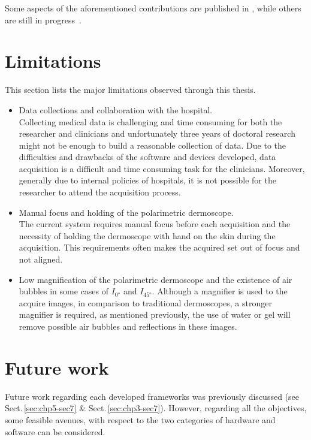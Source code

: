 Some aspects of the aforementioned contributions are published in \cite{rastgoo2015automatic,rastgoo2015ensemble,rastgoo2016classification,rastgoo2016tackling}, while others are still in progress~\cite{rastgoopol2,rastgoocadpol}.

\section{Limitations}\label{sec:chp6-sec3}
This section lists the major limitations observed through this thesis.
\begin{itemize}
\item Data collections and collaboration with the hospital.\\ 
Collecting medical data is challenging and time consuming for both the researcher and clinicians and unfortunately three years of doctoral research might not be enough to build a reasonable collection of data.
Due to the difficulties and drawbacks of the software and devices developed, data acquisition is a difficult and time consuming task for the clinicians.
Moreover, generally due to internal policies of hospitals, it is not possible for the researcher to attend the acquisition process. 

\item Manual focus and holding of the polarimetric dermoscope.\\
 The current system requires manual focus before each acquisition and the necessity of holding the dermoscope with hand on the skin during the acquisition. 
This requirements often makes the acquired set out of focus and not aligned.
\item Low magnification of the polarimetric dermoscope and the existence of air bubbles in some cases of $I_{\ang{0}}$ and $I_{\ang{45}}$.
Although a magnifier is used to the acquire images, in comparison to traditional dermoscopes, a stronger magnifier is required, as mentioned previously, the use of water or gel will remove possible air bubbles and reflections in these images. 
\end{itemize} 
 
\section{Future work}\label{sec:chp-sec4}
Future work regarding each developed frameworks was previously discussed (see Sect.\,\ref{sec:chp5-sec7} \& Sect.\,\ref{sec:chp3-sec7}).
However, regarding all the objectives, some feasible avenues, with respect to the two categories of hardware and software can be considered.

